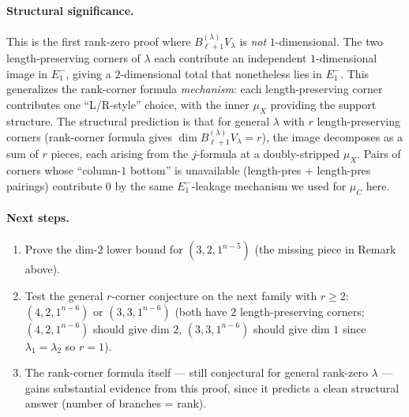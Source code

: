 \documentclass[11pt]{article}
\theoremstyle{definition}
\begin{document}
\paragraph{Structural significance.}  This is the first rank-zero
proof where $B_{\ell+1}^{(\lambda)} V_\lambda$ is \emph{not}
$1$-dimensional.  The two length-preserving corners of $\lambda$
each contribute an independent $1$-dimensional image in
$E_1^-$, giving a $2$-dimensional total that nonetheless
lies in $E_1^-$.  This generalizes the rank-corner formula
\emph{mechanism}: each length-preserving corner contributes one
``L/R-style'' choice, with the inner $\mu_X$ providing the support
structure.  The structural prediction is that for general
$\lambda$ with $r$ length-preserving corners (rank-corner
formula gives $\dim B_{\ell+1}^{(\lambda)} V_\lambda=r$),
the image decomposes as a sum of $r$ pieces, each arising from
the $j$-formula at a doubly-stripped $\mu_X$.  Pairs of corners
whose ``column-$1$ bottom'' is unavailable (length-pres + length-pres
pairings) contribute $0$ by the same $E_1^-$-leakage mechanism
we used for $\mu_C$ here.

\paragraph{Next steps.}
\begin{enumerate}[leftmargin=2em,topsep=0.3em,itemsep=0.2em,
label=(\arabic*)]
\item Prove the dim-$2$ lower bound for $(3,2,1^{n-5})$ (the missing
piece in Remark above).
\item Test the general $r$-corner conjecture on the next family
with $r\ge 2$: $(4,2,1^{n-6})$ or $(3,3,1^{n-6})$ (both have $2$
length-preserving corners; $(4,2,1^{n-6})$ should give dim $2$,
$(3,3,1^{n-6})$ should give dim $1$ since $\lambda_1=\lambda_2$ so
$r=1$).
\item The rank-corner formula itself --- still conjectural for
general rank-zero $\lambda$ --- gains substantial evidence from
this proof, since it predicts a clean structural answer (number of
branches = rank).
\end{enumerate}
\end{document}
